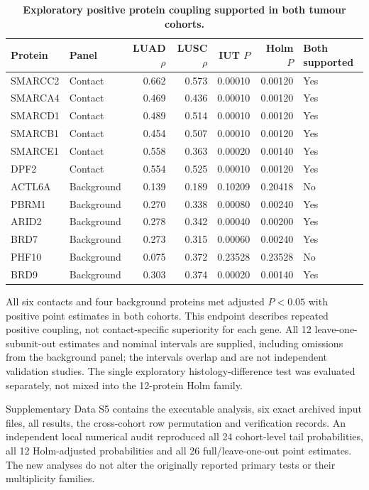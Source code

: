 \documentclass[11pt,letterpaper]{article}
\begin{document}
\begin{table}[H]
\centering\small
\caption{\textbf{Exploratory positive protein coupling supported in both tumour cohorts.}}
\label{tab:cross_histology}
\begin{tabular}{llrrrrl}
\toprule
Protein & Panel & LUAD $\rho$ & LUSC $\rho$ & IUT $P$ & Holm $P$ & Both supported \\
\midrule
SMARCC2 & Contact & 0.662 & 0.573 & 0.00010 & 0.00120 & Yes \\
SMARCA4 & Contact & 0.469 & 0.436 & 0.00010 & 0.00120 & Yes \\
SMARCD1 & Contact & 0.489 & 0.514 & 0.00010 & 0.00120 & Yes \\
SMARCB1 & Contact & 0.454 & 0.507 & 0.00010 & 0.00120 & Yes \\
SMARCE1 & Contact & 0.558 & 0.363 & 0.00020 & 0.00140 & Yes \\
DPF2 & Contact & 0.554 & 0.525 & 0.00010 & 0.00120 & Yes \\
ACTL6A & Background & 0.139 & 0.189 & 0.10209 & 0.20418 & No \\
PBRM1 & Background & 0.270 & 0.338 & 0.00080 & 0.00240 & Yes \\
ARID2 & Background & 0.278 & 0.342 & 0.00040 & 0.00200 & Yes \\
BRD7 & Background & 0.273 & 0.315 & 0.00060 & 0.00240 & Yes \\
PHF10 & Background & 0.075 & 0.372 & 0.23528 & 0.23528 & No \\
BRD9 & Background & 0.303 & 0.374 & 0.00020 & 0.00140 & Yes \\
\bottomrule
\end{tabular}
\end{table}

All six contacts and four background proteins met adjusted $P<0.05$ with positive point estimates in both cohorts. This endpoint describes repeated positive coupling, not contact-specific superiority for each gene. All 12 leave-one-subunit-out estimates and nominal intervals are supplied, including omissions from the background panel; the intervals overlap and are not independent validation studies. The single exploratory histology-difference test was evaluated separately, not mixed into the 12-protein Holm family.

Supplementary Data S5 contains the executable analysis, six exact archived input files, all results, the cross-cohort row permutation and verification records. An independent local numerical audit reproduced all 24 cohort-level tail probabilities, all 12 Holm-adjusted probabilities and all 26 full/leave-one-out point estimates. The new analyses do not alter the originally reported primary tests or their multiplicity families.
\end{document}

